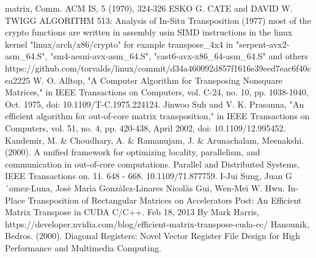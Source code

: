 \documentclass[conference]{IEEEtran}
\begin{document}
\begin{thebibliography}{00}
matrix, Comm. ACM IS, 5 (1970), 324-326
 ESKO G. CATE and DAVID W. TWIGG ALGORITHM 513: Analysis of In-Situ Transposition (1977)
 most of the crypto functions are written in assembly usin SIMD instructions in the
linux kernel "linux/arch/x86/crypto" for exanple transpose\_4x4 in "serpent-avx2-asm\_64.S", "sm4-aesni-avx-asm\_64.S",
"cast6-avx-x86\_64-asm\_64.S" and others
 https://github.com/torvalds/linux/commit/d34a460092d857f1616e39eed7eac6f40cea2225
 W. O. Alltop, "A Computer Algorithm for Transposing Nonsquare Matrices," in IEEE Transactions on Computers, vol. C-24, no. 10, pp. 1038-1040, Oct. 1975, doi: 10.1109/T-C.1975.224124.
 Jinwoo Suh and V. K. Prasanna, "An efficient algorithm for out-of-core matrix transposition," in IEEE Transactions on Computers, vol. 51, no. 4, pp. 420-438, April 2002, doi: 10.1109/12.995452.
 Kandemir, M. \& Choudhary, A. \& Ramanujam, J. \& Arunachalam, Meenakshi. (2000). A unified framework for optimizing locality, parallelism, and communication in out-of-core computations. Parallel and Distributed Systems, IEEE Transactions on. 11. 648 - 668. 10.1109/71.877759. 
 I-Jui Sung, Juan G´omez-Luna, Josè Marìa Gonzàlez-Linares
Nicolàs Gui, Wen-Mei W. Hwu. In-Place Transposition of Rectangular Matrices on Accelerators
 Post: An Efficient Matrix Transpose in CUDA C/C++. Feb 18, 2013 By Mark Harris, https://developer.nvidia.com/blog/efficient-matrix-transpose-cuda-cc/
 Hanounik, Bedros. (2000). Diagonal Registers: Novel Vector Register File Design for High Performance and Multimedia Computing. 
\end{thebibliography}
\vspace{12pt}
\end{document}
